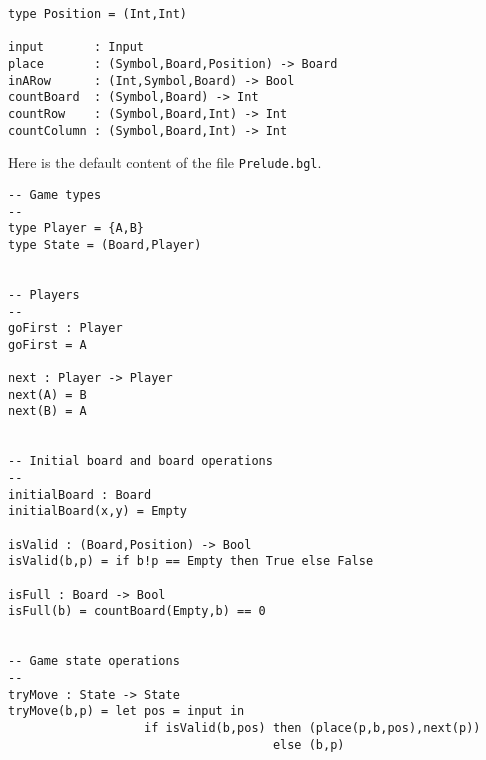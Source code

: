 \documentclass[11pt]{article}
\newcommand{\prog}[1]{\texttt{#1}}
\begin{document}
\begin{verbatim}
type Position = (Int,Int)

input       : Input
place       : (Symbol,Board,Position) -> Board
inARow      : (Int,Symbol,Board) -> Bool
countBoard  : (Symbol,Board) -> Int
countRow    : (Symbol,Board,Int) -> Int
countColumn : (Symbol,Board,Int) -> Int
\end{verbatim}
%
Here is the default content of the file \prog{Prelude.bgl}.

\begin{verbatim}
-- Game types
--
type Player = {A,B}
type State = (Board,Player)


-- Players
--
goFirst : Player
goFirst = A

next : Player -> Player
next(A) = B
next(B) = A


-- Initial board and board operations
--
initialBoard : Board
initialBoard(x,y) = Empty

isValid : (Board,Position) -> Bool
isValid(b,p) = if b!p == Empty then True else False

isFull : Board -> Bool
isFull(b) = countBoard(Empty,b) == 0


-- Game state operations
--
tryMove : State -> State
tryMove(b,p) = let pos = input in
                   if isValid(b,pos) then (place(p,b,pos),next(p))
                                     else (b,p)
\end{verbatim}
\end{document}
